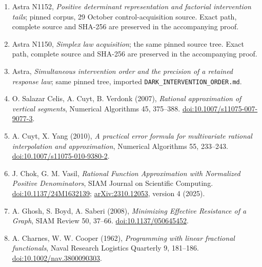 \documentclass[10pt,a4paper]{article}
\begin{document}
\begin{enumerate}
\item Astra N1152, \emph{Positive determinant representation and factorial
intervention tails}; pinned corpus, 29 October control-acquisition source.
Exact path, complete source and SHA-256 are preserved in the accompanying proof.
\item Astra N1150, \emph{Simplex law acquisition}; the same pinned source tree.
Exact path, complete source and SHA-256 are preserved in the accompanying proof.
\item Astra, \emph{Simultaneous intervention order and the precision of a
retained response law}; same pinned tree, imported
\texttt{DARK\_INTERVENTION\_ORDER.md}.
\item O. Salazar Celis, A. Cuyt, B. Verdonk (2007), \emph{Rational approximation
of vertical segments}, Numerical Algorithms 45, 375--388.
\href{https://doi.org/10.1007/s11075-007-9077-3}{doi:10.1007/s11075-007-9077-3}.
\item A. Cuyt, X. Yang (2010), \emph{A practical error formula for multivariate
rational interpolation and approximation}, Numerical Algorithms 55, 233--243.
\href{https://doi.org/10.1007/s11075-010-9380-2}{doi:10.1007/s11075-010-9380-2}.
\item J. Chok, G. M. Vasil, \emph{Rational Function Approximation with Normalized
Positive Denominators}, SIAM Journal on Scientific Computing.
\href{https://doi.org/10.1137/24M1632139}{doi:10.1137/24M1632139};
\href{https://arxiv.org/abs/2310.12053}{arXiv:2310.12053}, version 4 (2025).
\item A. Ghosh, S. Boyd, A. Saberi (2008), \emph{Minimizing Effective Resistance
of a Graph}, SIAM Review 50, 37--66.
\href{https://doi.org/10.1137/050645452}{doi:10.1137/050645452}.
\item A. Charnes, W. W. Cooper (1962), \emph{Programming with linear fractional
functionals}, Naval Research Logistics Quarterly 9, 181--186.
\href{https://doi.org/10.1002/nav.3800090303}{doi:10.1002/nav.3800090303}.
\end{enumerate}
\end{document}
